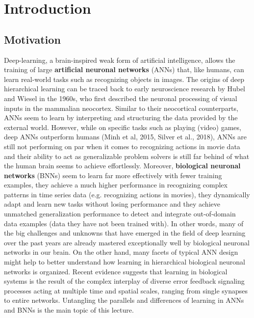 \documentclass[main]{subfiles}
\begin{document}
\newpage
\section{Introduction}

\subsection{Motivation}
Deep-learning, a brain-inspired weak form of artificial intelligence, allows the training of large \textbf{artificial neuronal networks} (ANNs) that, like humans, can learn real-world tasks such as recognizing objects in images. The origins of deep hierarchical learning can be traced back to early neuroscience research by Hubel and Wiesel in the 1960s, who first described the neuronal processing of visual inputs in the mammalian neocortex. Similar to their neocortical counterparts, ANNs seem to learn by interpreting and structuring the data provided by the external world. However, while on specific tasks such as playing (video) games, deep ANNs outperform humans (Minh et al, 2015, Silver et al., 2018), ANNs are still not performing on par when it comes to recognizing actions in movie data and their ability to act as generalizable problem solvers is still far behind of what the human brain seems to achieve effortlessly. Moreover, \textbf{biological neuronal networks} (BNNs) seem to learn far more effectively with fewer training examples, they achieve a much higher performance in recognizing complex patterns in time series data (e.g. recognizing actions in movies), they dynamically adapt and learn new tasks without losing performance and they achieve unmatched generalization performance to detect and integrate out-of-domain data examples (data they have not been trained with). In other words, many of the big challenges and unknowns that have emerged in the field of deep learning over the past years are already mastered exceptionally well by biological neuronal networks in our brain. On the other hand, many facets of typical ANN design might help to better understand how learning in hierarchical biological neuronal networks is organized. Recent evidence suggests that learning in biological systems is the result of the complex interplay of diverse error feedback signaling processes acting at multiple time and spatial scales, ranging from single synapses to entire networks. Untangling the parallels and differences of learning in ANNs and BNNs is the main topic of this lecture.
%
\end{document}
